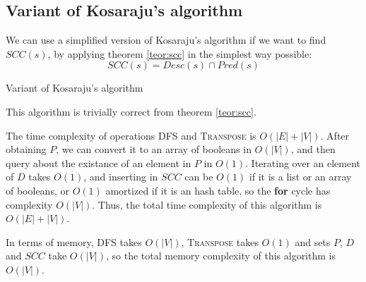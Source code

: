 \subsection{Variant of Kosaraju's algorithm} \label{algorithm-scc-kosaraju-v}
We can use a simplified version of Kosaraju's algorithm if we want to find $SCC(s)$, by applying theorem \ref{teor:scc} in the simplest way possible:
\begin{equation*}
    SCC(s) = Desc(s) \cap Pred(s)
\end{equation*}
\begin{algorithm}[H]
    \caption{Variant of Kosaraju's algorithm}
    \label{alg-kosaraju-v}
    \begin{algorithmic}[1]
             
             
            \State {}
        \EndFunction
    \end{algorithmic}
\end{algorithm}
This algorithm is trivially correct from theorem \ref{teor:scc}.\par
The time complexity of operations \textsc{DFS} and \textsc{Transpose} is $O(|E|+|V|)$. After obtaining $P$, we can convert it to an array of booleans in $O(|V|)$, and then query about the existance of an element in $P$ in $O(1)$. Iterating over an element of $D$ takes $O(1)$, and inserting in $SCC$ can be $O(1)$ if it is a list or an array of booleans, or $O(1)$ amortized if it is an hash table, so the \textbf{for} cycle has complexity $O(|V|)$. Thus, the total time complexity of this algorithm is $O(|E|+|V|)$.\par
In terms of memory, \textsc{DFS} takes $O(|V|)$, \textsc{Transpose} takes $O(1)$ and sets $P$, $D$ and $SCC$ take $O(|V|)$, so the total memory complexity of this algorithm is $O(|V|)$.
